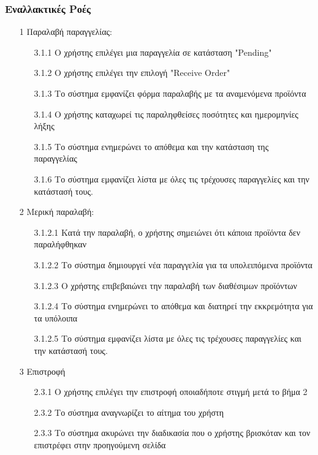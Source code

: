 \documentclass[12pt,a4paper,twoside]{book}
\begin{document}
\subsubsection{Εναλλακτικές Ροές}
\begin{enumerate}
  \item[1 ] Παραλαβή παραγγελίας:
        \begin{enumerate}
          \item[3.1.1 ] Ο χρήστης επιλέγει μια παραγγελία σε κατάσταση "Pending" %
          \item[3.1.2 ] Ο χρήστης επιλέγει την επιλογή "Receive Order" %
          \item[3.1.3 ] Το σύστημα εμφανίζει φόρμα παραλαβής με τα αναμενόμενα προϊόντα
          \item[3.1.4 ] Ο χρήστης καταχωρεί τις παραληφθείσες ποσότητες και ημερομηνίες λήξης
          \item[3.1.5 ] Το σύστημα ενημερώνει το απόθεμα και την κατάσταση της παραγγελίας
          \item[3.1.6 ] Το σύστημα εμφανίζει λίστα με όλες τις τρέχουσες παραγγελίες και την κατάστασή τους.
        \end{enumerate}
  \item[2 ] Μερική παραλαβή:
        \begin{enumerate}
          \item[3.1.2.1 ] Κατά την παραλαβή, ο χρήστης σημειώνει ότι κάποια προϊόντα δεν παραλήφθηκαν %
          \item[3.1.2.2 ] Το σύστημα δημιουργεί νέα παραγγελία για τα υπολειπόμενα προϊόντα %
          \item[3.1.2.3 ] Ο χρήστης επιβεβαιώνει την παραλαβή των διαθέσιμων προϊόντων %
          \item[3.1.2.4 ] Το σύστημα ενημερώνει το απόθεμα και διατηρεί την εκκρεμότητα για τα υπόλοιπα %
          \item[3.1.2.5] Το σύστημα εμφανίζει λίστα με όλες τις τρέχουσες παραγγελίες και την κατάστασή τους.
        \end{enumerate}
  \item[3 ] Επιστροφή
        \begin{enumerate}
          \item[2.3.1 ] Ο χρήστης επιλέγει την επιστροφή οποιαδήποτε στιγμή μετά το βήμα 2 %
          \item[2.3.2 ] Το σύστημα αναγνωρίζει το αίτημα του χρήστη %
          \item[2.3.3 ] Το σύστημα ακυρώνει την διαδικασία που ο χρήστης βρισκόταν και τον επιστρέφει στην προηγούμενη σελίδα %

\end{enumerate}
\end{enumerate}
\end{document}
